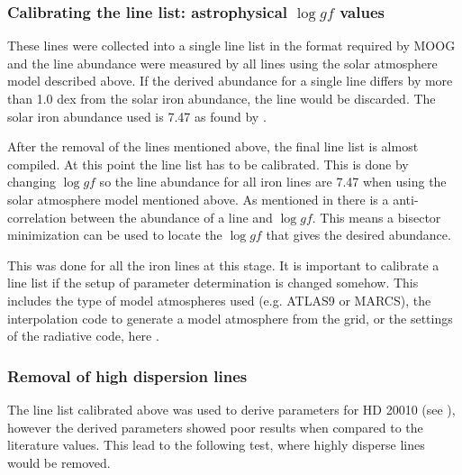 \subsubsection{Calibrating the line list: astrophysical $\log \mathit{gf}$ values}

These lines were collected into a single line list in the format required by MOOG \citep{Sneden1973}
and the line abundance were measured by all lines using the solar atmosphere model described above.
If the derived abundance for a single line differs by more than 1.0 dex from the solar iron
abundance, the line would be discarded. The solar iron abundance used is 7.47 as found by
\citet{Gonzalez2000}. 

After the removal of the lines mentioned above, the final line list is almost compiled. At this
point the line list has to be calibrated. This is done by changing $\log \mathit{gf}$ so the line
abundance for all iron lines are 7.47 when using the solar atmosphere model mentioned above. As
mentioned in  there is a anti-correlation between the abundance of a line and
$\log \mathit{gf}$. This means a bisector minimization can be used to locate the $\log \mathit{gf}$
that gives the desired abundance.

This was done for all the iron lines at this stage. It is important to calibrate a line list if the
setup of parameter determination is changed somehow. This includes the type of model atmospheres
used (e.g. ATLAS9 or MARCS), the interpolation code to generate a model atmosphere from the grid, or
the settings of the radiative code, here \MOOG.


\subsubsection{Removal of high dispersion lines}

The line list calibrated above was used to derive parameters for HD 20010 (see ),
however the derived parameters showed poor results when compared to the literature values. This lead
to the following test, where highly disperse lines would be removed.

